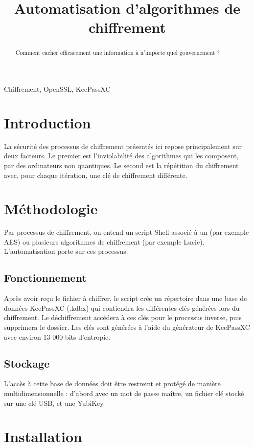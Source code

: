 \documentclass[conference]{IEEEtran}
\title{Automatisation d'algorithmes de chiffrement}
\author{
    \IEEEauthorblockN{Pigassou Mathis\IEEEauthorrefmark{1}} 
    \IEEEauthorblockA{UFR Informatique, Université Toulouse Capitole, France\\
    Email: mathis.pigassou@ut-capitole.fr}
}
\begin{document}
\maketitle  

\begin{abstract}  
Comment cacher efficacement une information à n'importe quel gouvernement ?
\end{abstract}
\begin{IEEEkeywords} 
    Chiffrement, OpenSSL, KeePassXC
\end{IEEEkeywords}

\section*{Introduction}  
La sécurité des processus de chiffrement présentés ici repose principalement sur deux facteurs. Le premier est l'inviolabilité des algorithmes qui les composent, par des ordinateurs non quantiques. Le second est la répétition du chiffrement avec, pour chaque itération, une clé de chiffrement différente. 

\section{Méthodologie}  
Par processus de chiffrement, on entend un script Shell associé à un (par exemple AES) ou plusieurs algorithmes de chiffrement (par exemple Lucie). L'automatisation porte sur ces processus.

\subsection{Fonctionnement}
Après avoir reçu le fichier à chiffrer, le script crée un répertoire dans une base de données KeePassXC (.kdbx) qui contiendra les différentes clés générées lors du chiffrement. Le déchiffrement accèdera à ces clés pour le processus inverse, puis supprimera le dossier. Les clés sont générées à l'aide du générateur de KeePassXC avec environ 13 000 bits d'entropie.

\subsection{Stockage}
L'accès à cette base de données doit être restreint et protégé de manière multidimensionnelle : d'abord avec un mot de passe maître, un fichier clé stocké sur une clé USB, et une YubiKey.

\section{Installation}
\end{document}
